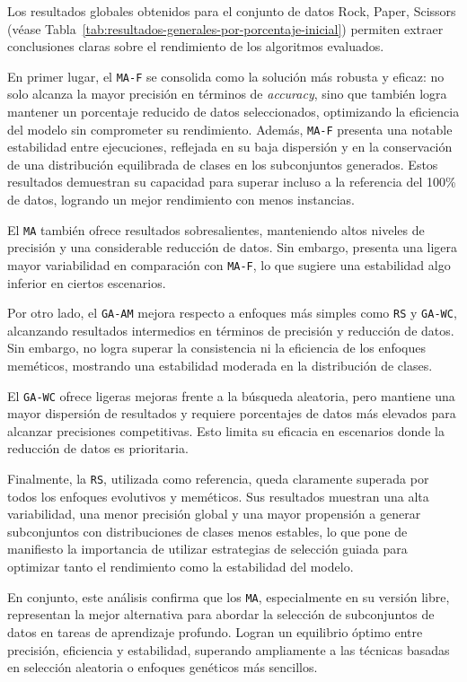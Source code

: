 Los resultados globales obtenidos para el conjunto de datos Rock, Paper, Scissors (véase Tabla~\ref{tab:resultados-generales-por-porcentaje-inicial})
permiten extraer conclusiones claras sobre el rendimiento de los algoritmos evaluados.

En primer lugar, el \texttt{MA-F} se consolida como la solución más robusta y eficaz: no solo alcanza la mayor precisión en términos de \textit{accuracy},
sino que también logra mantener un porcentaje reducido de datos seleccionados, optimizando la eficiencia del modelo sin comprometer su rendimiento.
Además, \texttt{MA-F} presenta una notable estabilidad entre ejecuciones,
reflejada en su baja dispersión y en la conservación de una distribución equilibrada de clases en los subconjuntos generados.
Estos resultados demuestran su capacidad para superar incluso a la referencia del 100\% de datos, logrando un mejor rendimiento con menos instancias.

El \texttt{MA} también ofrece resultados sobresalientes, manteniendo altos niveles de precisión y una considerable reducción de datos.
Sin embargo, presenta una ligera mayor variabilidad en comparación con \texttt{MA-F}, lo que sugiere una estabilidad algo inferior en ciertos escenarios.

Por otro lado, el \texttt{GA-AM} mejora respecto a enfoques más simples como \texttt{RS} y \texttt{GA-WC}, alcanzando resultados intermedios en términos de precisión y reducción de datos.
Sin embargo, no logra superar la consistencia ni la eficiencia de los enfoques meméticos, mostrando una estabilidad moderada en la distribución de clases.

El \texttt{GA-WC} ofrece ligeras mejoras frente a la búsqueda aleatoria,
pero mantiene una mayor dispersión de resultados y requiere porcentajes de datos más elevados para alcanzar precisiones competitivas.
Esto limita su eficacia en escenarios donde la reducción de datos es prioritaria.

Finalmente, la \texttt{RS}, utilizada como referencia, queda claramente superada por todos los enfoques evolutivos y meméticos.
Sus resultados muestran una alta variabilidad, una menor precisión global y una mayor propensión a generar subconjuntos con distribuciones de clases menos estables,
lo que pone de manifiesto la importancia de utilizar estrategias de selección guiada para optimizar tanto el rendimiento como la estabilidad del modelo.

En conjunto, este análisis confirma que los \texttt{MA}, especialmente en su versión libre,
representan la mejor alternativa para abordar la selección de subconjuntos de datos en tareas de aprendizaje profundo.
Logran un equilibrio óptimo entre precisión, eficiencia y estabilidad, superando ampliamente a las técnicas basadas en selección aleatoria o enfoques genéticos más sencillos.


